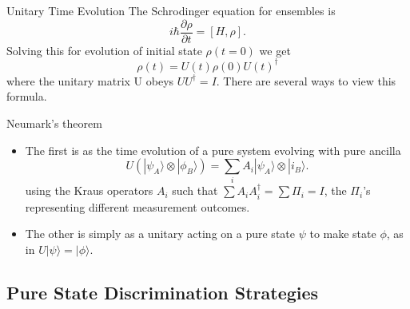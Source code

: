 \documentclass{beamer}
\newcommand{\ke}[1]{|#1\rangle}
\begin{document}
\begin{frame}{Unitary Time Evolution}
The Schrodinger equation for ensembles is
\[i \hbar \frac{\partial\rho}{\partial t} =  [H,\rho].\]
Solving this for evolution of initial state $\rho(t=0)$ we get
\[\rho(t) = U(t) \rho(0) U(t)^\dagger\]
 where the unitary matrix U obeys $UU^\dagger = I$.
There are several ways to view this formula.
\end{frame}
\begin{frame}{Neumark's theorem}
\begin{itemize}
\item
The first is as the time evolution of a pure system evolving with pure ancilla
\[U(\ke {\psi_A} \otimes \ke {\phi_B}) = \sum_i A_i \ke {\psi_A} \otimes \ke {i_B}.\]
using the  Kraus operators $A_i$ such that $\sum A_i A_i^\dagger = \sum \Pi_i = I$,
the $\Pi_i$'s representing different measurement outcomes.

\item
The other is simply as a unitary acting on a pure state $\psi$ to make state $\phi$, as in $U\ke \psi = \ke \phi$.
\end{itemize}
\end{frame}
\subsection{Pure State Discrimination Strategies}
\end{document}
